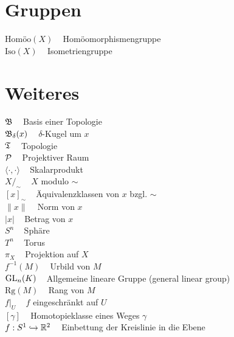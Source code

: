 \begin{minipage}[t]{0.45\textwidth}

\section*{Gruppen}
$\text{Homöo}(X)\;\;\;$ Homöomorphismengruppe\\
$\text{Iso}(X)\;\;\;$ Isometriengruppe\\

\section*{Weiteres}
$\mathfrak{B}\;\;\;$ Basis einer Topologie\\
$\mathfrak{B}_\delta(x)\;\;\;$ $\delta$-Kugel um $x$\\
$\mathfrak{T}\;\;\;$ Topologie\\

$\mathcal{P}\;\;\;$ Projektiver Raum\\
$\langle \cdot , \cdot \rangle\;\;\;$ Skalarprodukt\\
$X /_\sim\;\;\;$ $X$ modulo $\sim$\\
$[x]_\sim\;\;\;$ Äquivalenzklassen von $x$ bzgl. $\sim$\\
$\| x \|\;\;\;$ Norm von $x$\\
$| x |\;\;\;$ Betrag von $x$\\
$S^n\;\;\;$ Sphäre\\
$T^n\;\;\;$ Torus\\
$\pi_X\;\;\;$ Projektion auf $X$\\
$f^{-1}(M)\;\;\;$ Urbild von $M$\\
$\mathrm{GL}_n(K)\;\;\;$ Allgemeine lineare Gruppe (general linear group)\\
$\text{Rg}(M)\;\;\;$ Rang von $M$\\
$f|_U\;\;\;$ $f$ eingeschränkt auf $U$\\
$[\gamma]\;\;\;$ Homotopieklasse eines Weges $\gamma$\\
$f:S^1 \hookrightarrow \mathbb{R}^2\;\;\;$ Einbettung der Kreislinie in die Ebene

\end{minipage}
